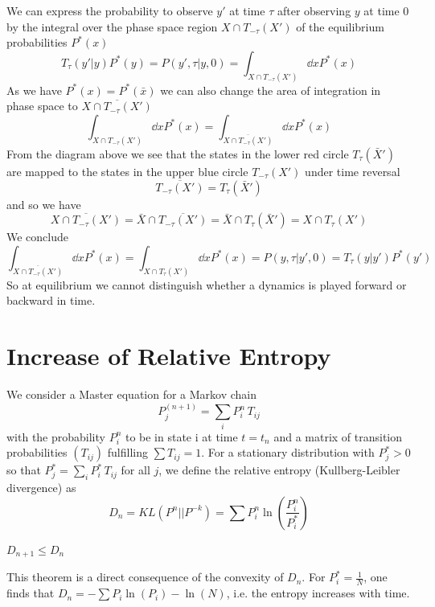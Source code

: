 \documentclass{notebook}
\begin{document}
We can express the probability to observe $y'$ at time $\tau$ after observing $y$ at time $0$ by the integral over the phase space region $X \cap T_{-\tau}(X')$ of the equilibrium probabilities $P^*(x)$
%
\begin{equation*}
T_{\tau}(y'|y) P^*(y) = P(y',\tau | y,0) = \int_{X \cap T_{-\tau}(X')} \dd{x} P^*(x) 	
\end{equation*}
%
As we have $P^*(x) = P^*(\bar{x})$ we can also change the area of integration in phase space to $\overline{X \cap T_{-\tau}(X')}$
%
\begin{equation*}
\int_{X \cap T_{-\tau}(X')} \dd{x} P^*(x) = \int_{\overline{X \cap T_{-\tau}(X')}} \dd{x} P^*(x)
\end{equation*}
%
From the diagram above we see that the states in the lower red circle $T_{\tau}(\bar{X}')$ are mapped to the states in the upper blue circle $T_{-\tau}(X')$ under time reversal
%
\begin{equation}
	\overline{T_{-\tau}(X')} = T_{\tau}(\bar{X}')
\end{equation}
%
and so we have
%
\begin{equation}
	\overline{X \cap T_{-\tau}(X')} = \bar{X} \cap \overline{T_{-\tau}(X')} = \bar{X} \cap T_{\tau}(\bar{X}') = X \cap T_{\tau}(X')
\end{equation}
% 
We conclude
%
\begin{equation}
\int_{\overline{X \cap T_{-\tau}(X')}} \dd{x} P^*(x) 
	= \int_{X \cap T_{\tau}(X')} \dd{x} P^*(x) 
	= P(y, \tau | y', 0) = T_{\tau}(y|y') P^*(y')
\end{equation}
%
So at equilibrium we cannot distinguish whether a dynamics is played forward or backward in time.

\section{Increase of Relative Entropy}

We consider a Master equation for a Markov chain
%
\begin{equation}
	P_j^{(n+1)} = \sum_i{P_i^n \, T_{ij}}
\end{equation}
%
with the probability $P_i^n$ to be in state i at time $t = t_n$ and a matrix of transition probabilities $\left( T_{ij} \right)$ fulfilling $\sum T_{ij} = 1$. For a stationary distribution with $P_j^* > 0$ so that $P_j^* = \sum_i P_i^* \, T_{ij}$ for all $j$, we define the relative entropy (Kullberg-Leibler divergence) as
%
\begin{equation}
	D_n = K L(P^n||P^{-k}) = \sum P_i^n \ln \left( \frac{P_i^n}{P_i^*} \right)
\end{equation}
%
%
\begin{theorem}[Theorem]
	$D_{n+1} \leq D_n$
\end{theorem}
%
This theorem is a direct consequence of the convexity of $D_n$. For $P_i^* = \frac{1}{N}$, one finds that $D_n = -\sum P_i \ln(P_i) - \ln(N)$, i.e. the entropy increases with time.
\end{document}
